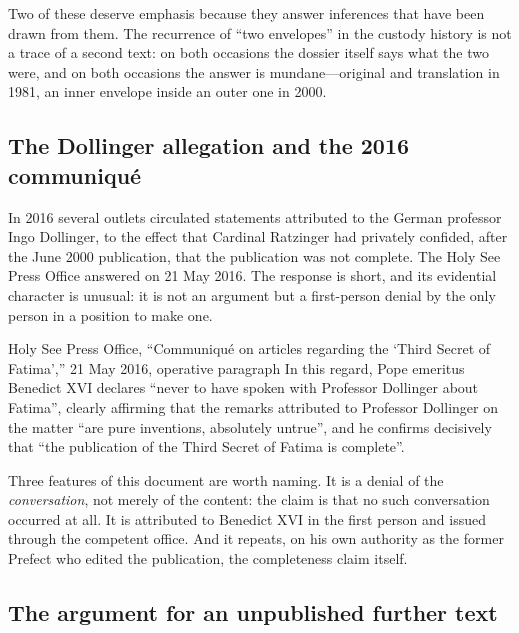Two of these deserve emphasis because they answer inferences that
have been drawn from them. The recurrence of ``two envelopes'' in the
custody history is not a trace of a second text: on both occasions
the dossier itself says what the two were, and on both occasions the
answer is mundane---original and translation in 1981, an inner
envelope inside an outer one in 2000.

\subsection{The Dollinger allegation and the 2016 communiqu\'e}

In 2016 several outlets circulated statements attributed to the
German professor Ingo Dollinger, to the effect that Cardinal
Ratzinger had privately confided, after the June 2000 publication,
that the publication was not complete. The Holy See Press Office
answered on 21 May 2016. The response is short, and its evidential
character is unusual: it is not an argument but a first-person denial
by the only person in a position to make one.

\begin{operativetext}{Holy See Press Office, ``Communiqu\'e on
articles regarding the `Third Secret of Fatima','' 21 May 2016,
operative paragraph}
In this regard, Pope emeritus Benedict XVI declares ``never to have
spoken with Professor Dollinger about Fatima'', clearly affirming
that the remarks attributed to Professor Dollinger on the matter
``are pure inventions, absolutely untrue'', and he confirms
decisively that ``the publication of the Third Secret of Fatima is
complete''.
\end{operativetext}

Three features of this document are worth naming. It is a denial of
the \emph{conversation}, not merely of the content: the claim is that
no such conversation occurred at all. It is attributed to Benedict
XVI in the first person and issued through the competent office. And
it repeats, on his own authority as the former Prefect who edited the
publication, the completeness claim itself.

\subsection{The argument for an unpublished further text}


